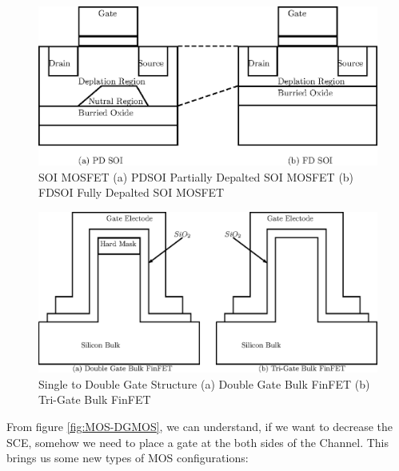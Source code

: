 \documentclass[a4paper]{article}
\begin{document}
\begin{figure}[!h]
  \includegraphics[scale=0.8]{./BulkFinFET-PD-FD-SOI.eps}
  \caption{SOI MOSFET (a) PDSOI Partially Depalted SOI MOSFET (b) FDSOI Fully Depalted SOI MOSFET}
  \label{fig:PDSOI-FDSOI}
\end{figure}

\begin{figure}[!h]
  \includegraphics[scale=0.8]{./BulkFinFET-FinFET.eps}
  \caption{Single to Double Gate Structure (a) Double Gate Bulk FinFET (b) Tri-Gate Bulk FinFET}
  \label{fig:FinFET}
\end{figure}


From figure \ref {fig:MOS-DGMOS}, we can understand, if we want to decrease the SCE, somehow we need to place a gate at the both sides of the Channel. This brings us some new types of MOS configurations:
\end{document}
